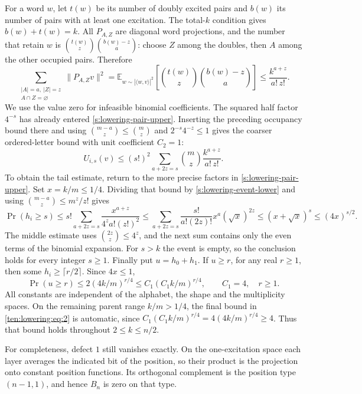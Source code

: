 For a word \(w\), let \(t(w)\) be its number of doubly excited pairs
and \(b(w)\) its number of pairs with at least one excitation.
The total-\(k\) condition gives \(b(w)+t(w)=k\).  All \(P_{A,Z}\)
are diagonal word projections, and the number that retain \(w\) is
\(\binom{t(w)}z\binom{b(w)-z}a\): choose \(Z\) among the doubles,
then \(A\) among the other occupied pairs.  Therefore
\[
 \sum_{\substack{|A|=a,\ |Z|=z\\A\cap Z=\varnothing}}
       \|P_{A,Z}v\|^2
 =\mathbb E_{w\sim|\langle w,v\rangle|^2}
       \left[\binom{t(w)}z\binom{b(w)-z}a\right]
 \le\frac{k^{a+z}}{a!\,z!}.
\]
We use the value zero for infeasible binomial coefficients.
The squared half factor \(4^{-s}\) has already entered
\eqref{s:lowering-pair-upper}. Inserting the preceding occupancy bound
there and using \(\binom{m-a}{z}\le\binom mz\) and
\(2^{-s}4^{-z}\le1\) gives the coarser ordered-letter bound with unit
coefficient \(C_2=1\):
\[
 U_{i,s}(v)\le (s!)^2
       \sum_{a+2z=s}\binom mz\frac{k^{a+z}}{a!\,z!}.
\]
To obtain the tail estimate, return to the more precise factors in
\eqref{s:lowering-pair-upper}. Set \(x=k/m\le1/4\).
Dividing that bound by \eqref{s:lowering-event-lower} and using
\(\binom{m-a}{z}\le m^z/z!\) gives
\[
 \Pr(h_i\ge s)
 \le s!\sum_{a+2z=s}\frac{x^{a+z}}{4^z a!(z!)^2}
 \le\sum_{a+2z=s}\frac{s!}{a!(2z)!}x^a(\sqrt{x})^{2z}
 \le(x+\sqrt{x})^s
 \le(4x)^{s/2}.
\]
The middle estimate uses \(\binom{2z}{z}\le4^z\), and the next sum
contains only the even terms of the binomial expansion.  For \(s>k\)
the event is empty, so the conclusion holds for every integer \(s\ge1\).
Finally put \(u=h_0+h_1\).  If \(u\ge r\), for any real \(r\ge1\),
then some \(h_i\ge\lceil r/2\rceil\).  Since \(4x\le1\),
\begin{equation}\label{ten:lowering:eq:2}
 \Pr(u\ge r)\le2(4k/m)^{r/4}
              \le C_1(C_1k/m)^{r/4},
 \qquad C_1=4,\quad r\ge1 .
\end{equation}
All constants are independent of the alphabet, the shape and the
multiplicity spaces.
On the remaining parent range \(k/m>1/4\), the final bound in
\eqref{ten:lowering:eq:2} is automatic, since
\(C_1(C_1k/m)^{r/4}=4(4k/m)^{r/4}\ge4\).
Thus that bound holds throughout \(2\le k\le n/2\).

For completeness, defect \(1\) still vanishes exactly.  On the
one-excitation space each layer averages the indicated bit of the
position, so their product is the projection onto constant position
functions.  Its orthogonal complement is the position type
\((n-1,1)\), and hence \(B_n\) is zero on that type.

